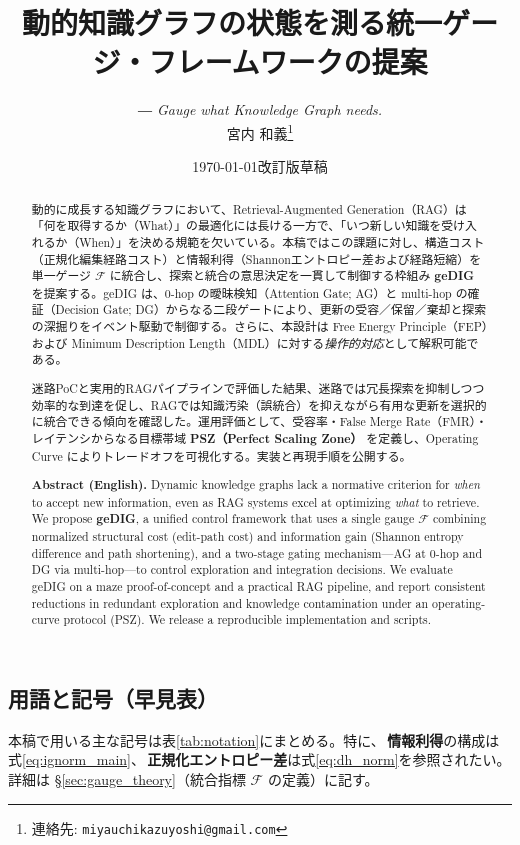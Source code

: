 \documentclass[ja=standard,xelatex]{bxjsarticle}
\title{動的知識グラフの状態を測る統一ゲージ・フレームワークの提案}
\author{\texorpdfstring{\textit{\small ― Gauge what Knowledge Graph needs.}\\[0.3em]}{}%
宮内 和義\thanks{連絡先: \texttt{miyauchikazuyoshi@gmail.com}}}
\date{\today 改訂版草稿}
\newcommand{\F}{\mathcal{F}}
\begin{document}
\sloppy
\maketitle

\begin{abstract}
動的に成長する知識グラフにおいて、Retrieval-Augmented Generation（RAG）は「何を取得するか（What）」の最適化には長ける一方で、「いつ新しい知識を受け入れるか（When）」を決める規範を欠いている。本稿ではこの課題に対し、構造コスト（正規化編集経路コスト）と情報利得（Shannonエントロピー差および経路短縮）を単一ゲージ $\F$ に統合し、探索と統合の意思決定を一貫して制御する枠組み \textbf{geDIG} を提案する。geDIG は、0-hop の曖昧検知（Attention Gate; AG）と multi-hop の確証（Decision Gate; DG）からなる二段ゲートにより、更新の受容／保留／棄却と探索の深掘りをイベント駆動で制御する。さらに、本設計は Free Energy Principle（FEP）および Minimum Description Length（MDL）に対する\textit{操作的対応}として解釈可能である。

迷路PoCと実用的RAGパイプラインで評価した結果、迷路では冗長探索を抑制しつつ効率的な到達を促し、RAGでは知識汚染（誤統合）を抑えながら有用な更新を選択的に統合できる傾向を確認した。運用評価として、受容率・False Merge Rate（FMR）・レイテンシからなる目標帯域 \textbf{PSZ（Perfect Scaling Zone）} を定義し、Operating Curve によりトレードオフを可視化する。実装と再現手順を公開する。

\par\medskip
\noindent\textbf{Abstract (English).}\;
Dynamic knowledge graphs lack a normative criterion for \emph{when} to accept new information, even as RAG systems excel at optimizing \emph{what} to retrieve. We propose \textbf{geDIG}, a unified control framework that uses a single gauge $\F$ combining normalized structural cost (edit-path cost) and information gain (Shannon entropy difference and path shortening), and a two-stage gating mechanism---AG at 0-hop and DG via multi-hop---to control exploration and integration decisions. We evaluate geDIG on a maze proof-of-concept and a practical RAG pipeline, and report consistent reductions in redundant exploration and knowledge contamination under an operating-curve protocol (PSZ). We release a reproducible implementation and scripts.
\end{abstract}

\subsection*{用語と記号（早見表）}
本稿で用いる主な記号は表\ref{tab:notation}にまとめる。特に、\,\textbf{情報利得}の構成は式\eqref{eq:ignorm_main}、\,\textbf{正規化エントロピー差}は式\eqref{eq:dh_norm}を参照されたい。詳細は §\ref{sec:gauge_theory}（統合指標 $\F$ の定義）に記す。
\end{document}
